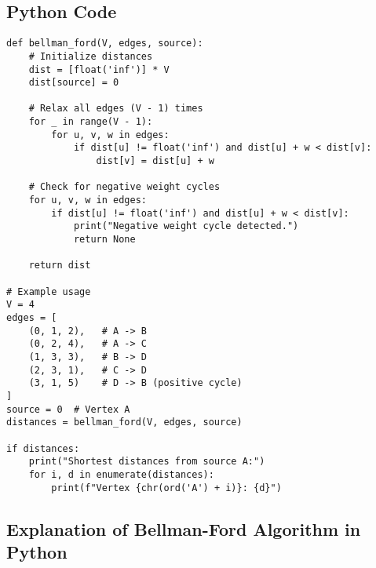 \documentclass[14pt,a4paper]{extarticle}
\begin{document}
\newpage    
\subsection{Python Code}
\begin{lstlisting}[style=python, caption={Bellman-Ford Algorithm in Python}]
def bellman_ford(V, edges, source):
    # Initialize distances
    dist = [float('inf')] * V
    dist[source] = 0

    # Relax all edges (V - 1) times
    for _ in range(V - 1):
        for u, v, w in edges:
            if dist[u] != float('inf') and dist[u] + w < dist[v]:
                dist[v] = dist[u] + w

    # Check for negative weight cycles
    for u, v, w in edges:
        if dist[u] != float('inf') and dist[u] + w < dist[v]:
            print("Negative weight cycle detected.")
            return None

    return dist

# Example usage
V = 4
edges = [
    (0, 1, 2),   # A -> B
    (0, 2, 4),   # A -> C
    (1, 3, 3),   # B -> D
    (2, 3, 1),   # C -> D
    (3, 1, 5)    # D -> B (positive cycle)
]
source = 0  # Vertex A
distances = bellman_ford(V, edges, source)

if distances:
    print("Shortest distances from source A:")
    for i, d in enumerate(distances):
        print(f"Vertex {chr(ord('A') + i)}: {d}")
\end{lstlisting}

\newpage
\subsection{Explanation of Bellman-Ford Algorithm in Python}
\end{document}
